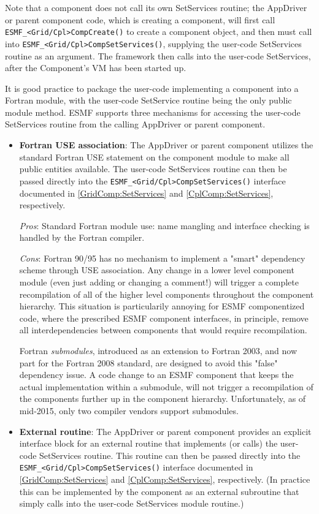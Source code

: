 Note that a component does not call its own SetServices routine;
the AppDriver or parent component code, which is creating a component, 
will first call {\tt ESMF\_<Grid/Cpl>CompCreate()} to create a component object, and then must call into {\tt ESMF\_<Grid/Cpl>CompSetServices()}, supplying the user-code SetServices routine as an argument. The framework then calls into the user-code SetServices, after the Component's VM has been started up.

It is good practice to package the user-code implementing a component into a Fortran module, with the user-code SetService routine being the only public module method. ESMF supports three mechanisms for accessing the user-code SetServices routine from the calling AppDriver or parent component.

\begin{itemize}
\item {\bf Fortran USE association}: The AppDriver or parent component utilizes the standard Fortran USE statement on the component module to make all public entities available. The user-code SetServices routine can then be passed directly into the {\tt ESMF\_<Grid/Cpl>CompSetServices()} interface documented in \ref{GridComp:SetServices} and \ref{CplComp:SetServices}, respectively.

{\em Pros}: Standard Fortran module use: name mangling and interface checking is handled by the Fortran compiler.

{\em Cons}: Fortran 90/95 has no mechanism to implement a "smart" dependency scheme through USE association. Any change in a lower level component module (even just adding or changing a comment!) will trigger a complete recompilation of all of the higher level components throughout the component hierarchy. This situation is particularily annoying for ESMF componentized code, where the prescribed ESMF component interfaces, in principle, remove all interdependencies between components that would require recompilation.

Fortran {\em submodules}, introduced as an extension to Fortran 2003, and now part for the Fortran 2008 standard, are designed to avoid this "false" dependency issue. A code change to an ESMF component that keeps the actual implementation within a submodule, will not trigger a recompilation of the components further up in the component hierarchy. Unfortunately, as of mid-2015, only two compiler vendors support submodules.

\item {\bf External routine}: The AppDriver or parent component provides an explicit interface block for an external routine that implements (or calls) the user-code SetServices routine. This routine can then be passed directly into the {\tt ESMF\_<Grid/Cpl>CompSetServices()} interface documented in \ref{GridComp:SetServices} and \ref{CplComp:SetServices}, respectively. (In practice this can be implemented by the component as an external subroutine that simply calls into the user-code SetServices module routine.)


\end{itemize}
